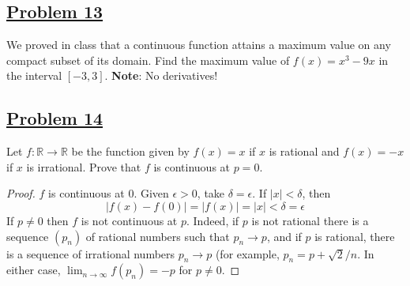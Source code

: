 \documentclass[10pt,letterpaper]{article}
\begin{document}
	\subsection*{{\color{purple}\underline{Problem 13}}}
	We proved in class that a continuous function attains a maximum value on any compact subset
	of its domain. Find the maximum value of $f(x) = x^3 - 9x$ in the interval $[-3,3]$. 
	\textbf{Note}: No derivatives!
	
	
	\subsection*{{\color{purple}\underline{Problem 14}}}
	Let $f: \mathbb{R} \rightarrow \mathbb{R}$ be the function given by $f(x) = x$ if $x$ is rational and $f(x) = -x$ if $x$ is irrational.
	Prove that $f$ is continuous at $p = 0$.
	\begin{proof}
	$f$ is continuous at $0$. Given $\epsilon > 0$, take $\delta = \epsilon$. If $|x| < \delta$, then
	$$|f(x) - f(0)| = |f(x)| = |x| < \delta = \epsilon$$
	If $p \neq 0$ then $f$ is not continuous at $p$. Indeed, if $p$ is not rational there is a sequence $(p_n)$ of rational numbers such that
	$p_n \rightarrow p$, and if $p$ is rational, there is a sequence of irrational numbers $p_n \rightarrow p$ (for example, 
	$p_n = p + \sqrt{2}/n$. In either case, $\displaystyle\lim_{n\to \infty}f(p_n) = -p$ for $p \neq 0$.
	\end{proof}
	
	
\end{document}
